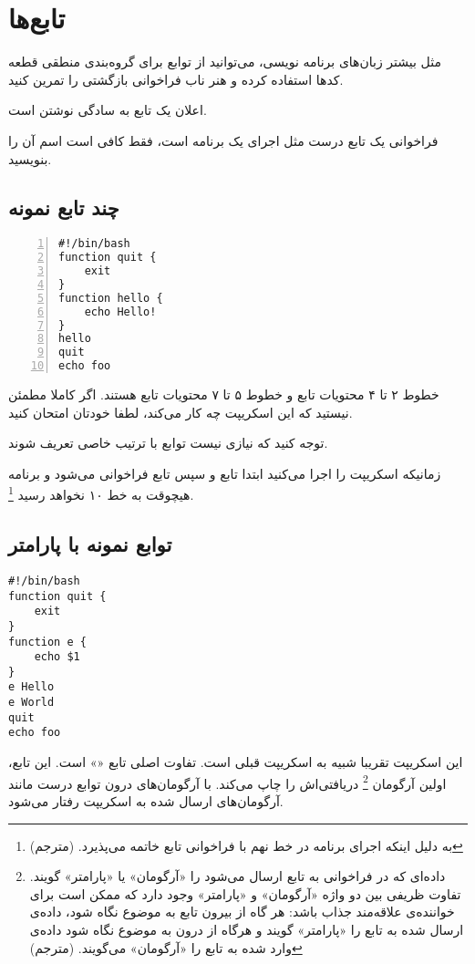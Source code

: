 \chapter{تابع‌ها}
مثل بیشتر زبان‌های برنامه نویسی‌، می‌توانید از توابع برای گروه‌بندی منطقی قطعه کدها
استفاده کرده و هنر ناب فراخوانی بازگشتی را تمرین کنید.

اعلان یک تابع به سادگی نوشتن
است.

فراخوانی یک تابع درست مثل اجرای یک برنامه است‌، فقط کافی است اسم آن را بنویسید‌.

\section*{چند تابع نمونه}
\begin{latin}
\begin{lstlisting}[numbers=left, numberstyle=\color{red}]
#!/bin/bash
function quit {
	exit
}
function hello {
	echo Hello!
}
hello
quit
echo foo
\end{lstlisting}
\end{latin}

خطوط ۲ تا ۴ محتویات تابع  و خطوط ۵ تا ۷ محتویات تابع  هستند. اگر کاملا
مطمئن نیستید که این اسکریپت چه کار می‌کند، لطفا خودتان امتحان کنید.

توجه کنید که نیازی نیست توابع با ترتیب خاصی تعریف شوند.

زمانیکه اسکریپت را اجرا می‌کنید ابتدا تابع  و سپس تابع  فراخوانی می‌شود
و برنامه هیچوقت به خط ۱۰ نخواهد رسید
\footnote{به دلیل اینکه اجرای برنامه در خط نهم با فراخوانی تابع  خاتمه می‌پذیرد. (مترجم)}.



\section*{توابع نمونه با پارامتر}
\begin{latin}
\begin{lstlisting}
#!/bin/bash
function quit {
	exit
}
function e {
	echo $1
}
e Hello
e World
quit
echo foo
\end{lstlisting}
\end{latin}

این اسکریپت تقریبا شبیه به اسکریپت قبلی است‌. تفاوت اصلی تابع «» است‌. این تابع‌،
اولین آرگومان
\footnote{
داده‌ای که در فراخوانی به تابع ارسال می‌شود را «آرگومان» یا «پارامتر» گویند. تفاوت
ظریفی بین دو واژه «آرگومان» و «پارامتر» وجود دارد که ممکن است برای خواننده‌ی علاقه‌مند
جذاب باشد: هر گاه از بیرون تابع به موضوع نگاه شود، داده‌ی ارسال شده به تابع را «پارامتر»
گویند و هرگاه از درون به موضوع نگاه شود داده‌ی وارد شده به تابع را «آرگومان» می‌گویند.
(مترجم)
}
دریافتی‌اش را چاپ می‌کند‌. با آرگومان‌ها‌ی درون توابع‌ درست مانند
آرگومان‌های ارسال شده به اسکریپت رفتار می‌شود.